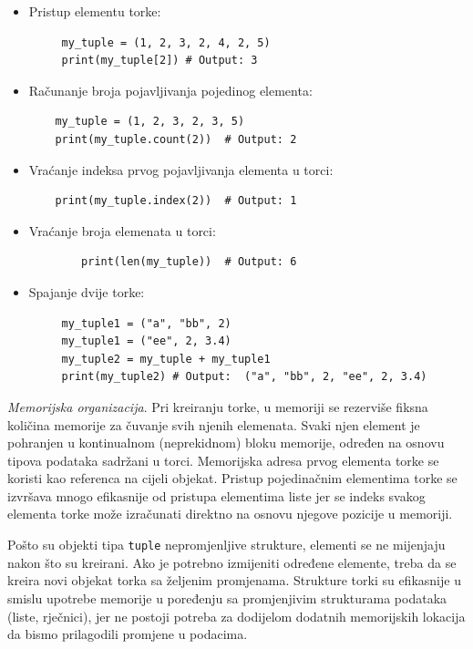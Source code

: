  \begin{itemize}
 	\item Pristup elementu torke:
 	\begin{verbatim}
     my_tuple = (1, 2, 3, 2, 4, 2, 5)
     print(my_tuple[2]) # Output: 3
 	\end{verbatim}
    \item  Računanje broja pojavljivanja pojedinog elementa:
    
	\begin{verbatim}    
    my_tuple = (1, 2, 3, 2, 3, 5)
    print(my_tuple.count(2))  # Output: 2
    	\end{verbatim}
    \item Vraćanje indeksa prvog pojavljivanja elementa u torci:
   	\begin{verbatim}    
    print(my_tuple.index(2))  # Output: 1
   	\end{verbatim}
    \item Vraćanje broja elemenata u torci:
       	\begin{verbatim}    
    	print(len(my_tuple))  # Output: 6
    \end{verbatim}
    \item Spajanje dvije torke:
  	\begin{verbatim}    
     my_tuple1 = ("a", "bb", 2)
     my_tuple1 = ("ee", 2, 3.4)
     my_tuple2 = my_tuple + my_tuple1 
     print(my_tuple2) # Output:  ("a", "bb", 2, "ee", 2, 3.4)
    \end{verbatim}
 \end{itemize}
 
\textit{Memorijska organizacija}.  Pri kreiranju torke, u memoriji se rezerviše fiksna količina memorije za čuvanje svih njenih elemenata. Svaki njen element je pohranjen u kontinualnom  (neprekidnom) bloku memorije,  određen na osnovu tipova podataka sadržani u torci.  Memorijska adresa prvog elementa torke se koristi kao referenca na cijeli objekat. %
Pristup pojedinačnim elementima torke se izvršava mnogo efikasnije od pristupa elementima liste jer se indeks svakog elementa torke može  izračunati direktno na osnovu njegove pozicije u memoriji. 

Pošto su objekti tipa \texttt{tuple} nepromjenljive strukture, elementi se ne mijenjaju  nakon što su kreirani. Ako je  potrebno izmijeniti određene elemente, treba da se kreira novi objekat torka sa željenim promjenama. Strukture torki su  efikasnije u smislu upotrebe memorije u poređenju sa promjenjivim strukturama podataka (liste, rječnici), jer ne postoji potreba za dodijelom dodatnih memorijskih lokacija da bismo prilagodili promjene u podacima.
 
